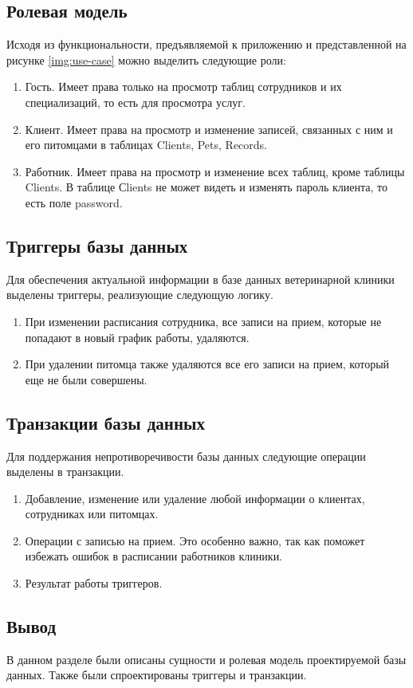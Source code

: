 \subsection{Ролевая модель}
Исходя из функциональности, предъявляемой к приложению и представленной на рисунке \ref{img:use-case} можно выделить следующие роли:
\begin{enumerate}[label=\arabic*)]
	\item Гость. Имеет права только на просмотр таблиц сотрудников и их специализаций, то есть для просмотра услуг.
	\item Клиент. Имеет права на просмотр и изменение записей, связанных с ним и его питомцами в таблицах Clients, Pets, Records.
	\item Работник. Имеет права на просмотр и изменение всех таблиц, кроме таблицы Clients. В таблице Сlients не может видеть и изменять пароль клиента, то есть поле password.  
\end{enumerate}

\subsection{Триггеры базы данных}

Для обеспечения актуальной информации в базе данных ветеринарной клиники выделены триггеры, реализующие следующую логику.

\begin{enumerate}[label=\arabic*)]
	\item При изменении расписания сотрудника, все записи на прием, которые не попадают в новый график работы, удаляются. 
	\item При удалении питомца также удаляются все его записи на прием, который еще не были совершены.
\end{enumerate}

\subsection{Транзакции базы данных}
Для поддержания непротиворечивости базы данных следующие операции выделены в транзакции.

\begin{enumerate}[label=\arabic*)]
	\item Добавление, изменение или удаление любой информации о клиентах, сотрудниках или питомцах. 
	\item Операции с записью на прием. Это особенно важно, так как поможет избежать ошибок в расписании работников клиники.
	\item Результат работы триггеров. 
\end{enumerate}


\subsection*{Вывод}
В данном разделе были описаны сущности и ролевая модель проектируемой базы данных. Также были спроектированы триггеры и транзакции.